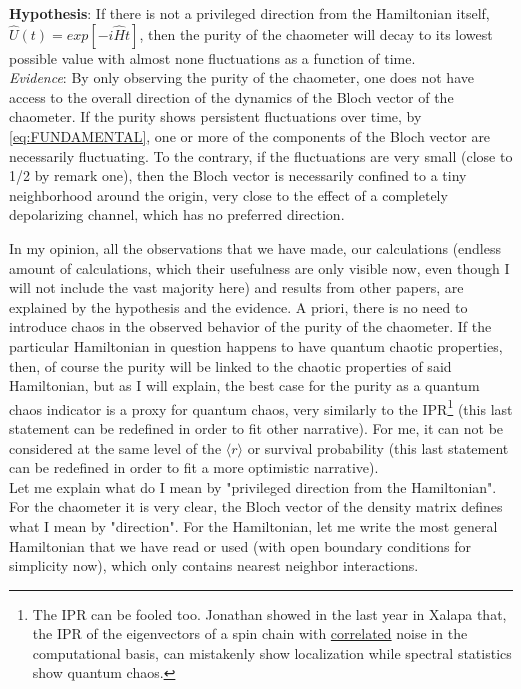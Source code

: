 \textbf{Hypothesis}: If there is not a privileged direction from the Hamiltonian itself, $\hat{U}(t) = exp[-i\hat{H}t]$, then the purity of the chaometer will decay to its lowest possible value with almost none fluctuations as a function of time.\\

\emph{Evidence}: By only observing the purity of the chaometer, one does not have access to the overall direction of the dynamics of the Bloch vector of the chaometer. If the purity shows persistent fluctuations over time, by \ref{eq:FUNDAMENTAL}, one or more of the components of the Bloch vector are necessarily fluctuating. To the contrary, if the fluctuations are very small (close to 1/2 by remark one), then the Bloch vector is necessarily confined to a tiny neighborhood around the origin, very close to the effect of a completely depolarizing channel, which has no preferred direction. 

In my opinion, all the observations that we have made, our calculations (endless amount of calculations, which their usefulness are only visible now, even though I will not include the vast majority here) and results from other papers, are explained by the hypothesis and the evidence. A priori, there is no need to introduce chaos in the observed behavior of the purity of the chaometer. If the particular Hamiltonian in question happens to have quantum chaotic properties, then, of course the purity will be linked to the chaotic properties of said Hamiltonian, but as I will explain, the best case for the purity as a quantum chaos indicator is a proxy for quantum chaos, very similarly to the IPR\footnote{The IPR can be fooled too. Jonathan showed in the last year in Xalapa that, the IPR of the eigenvectors of a spin chain with \underline{correlated} noise in the computational basis, can mistakenly show localization while spectral statistics show quantum chaos.} (this last statement can be redefined in order to fit other narrative). For me, it can not be considered at the same level of the $\langle r\rangle$ or survival probability (this last statement can be redefined in order to fit a more optimistic narrative).\\

Let me explain what do I mean by "privileged direction from the Hamiltonian". For the chaometer it is very clear, the Bloch vector of the density matrix defines what I mean by "direction". For the Hamiltonian, let me write the most general Hamiltonian that we have read or used (with open boundary conditions for simplicity now), which only contains nearest neighbor interactions.

